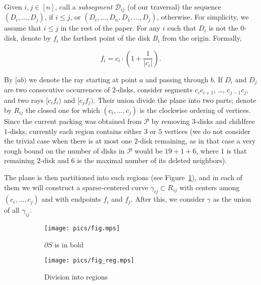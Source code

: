 Given $i,j\in[n]$, call a \textit{subsegment} $\mathcal{D}_{ij}$ (of our traversal) the sequence $(D_i, \ldots, D_j)$, if $i \leq j$, or $(D_i, \ldots, D_n, D_1, \ldots, D_j)$, otherwise. For simplicity, we assume that $i\leq j$ in the rest of the paper. For any $i$ such that $D_i$ is not the $0$-disk, denote by $f_i$ the farthest point of the disk $B_i$ from the origin.
Formally,

$$f_i = c_i\cdot\left(1 + \frac{1}{|c_i|}\right).$$

By $[ab)$ we denote the ray starting at point $a$ and passing through $b$. If $D_i$ and $D_j$ are two consecutive occurrences of $2$-disks, consider segments $c_ic_{i+1}$, \ldots, $c_{j-1}c_j$, and two rays $[c_if_i)$ and $[c_jf_j)$. Their union divide the plane into two parts; denote by $R_{ij}$ the closed one for which $(c_i, \ldots, c_j)$ is the clockwise ordering of vertices. Since the current packing was obtained from $\mathcal{P}$ by removing $3$-disks and childfree $1$-disks, currently each region contains either $3$ or $5$ vertices (we do not consider the trivial case when there is at most one $2$-disk remaining, as in that case a very rough bound on the number of disks in $\mathcal{P}$ would be $19 + 1 + 6$, where $1$ is that remaining $2$-disk and $6$ is the maximal number of its deleted neighbors).

The plane is then partitioned into such regions (see Figure~\ref{fig:regions}), and in each of them we will construct a sparse-centered curve $\gamma_{ij}\subset R_{ij}$ with centers among $(c_i, \ldots, c_j)$ and with endpoints $f_i$ and $f_j$. After this, we consider $\gamma$ as the union of all $\gamma_{ij}$.

\begin{figure}[h!]
    \centering
    \begin{subfigure}{.4\textwidth}
    \texttt{[image: pics/fig.mps]}
    \caption{$\partial{S}$ is in bold}
    \end{subfigure}
    \begin{subfigure}{.4\textwidth}
    \texttt{[image: pics/fig\_reg.mps]}
    \caption{Division into regions}
    \end{subfigure}
    \caption{}
    \label{fig:regions}
\end{figure}


